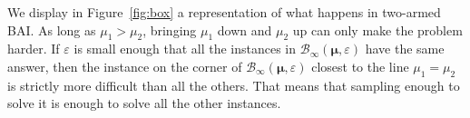 We display in Figure~\ref{fig:box} a representation of what happens in two-armed BAI.
As long as $\mu_1>\mu_2$, bringing $\mu_1$ down and $\mu_2$ up can only make the problem harder.
If $\varepsilon$ is small enough that all the instances in $\mathcal{B}_\infty(\bm\mu,\varepsilon)$ have the same answer, then the instance on the corner of $\mathcal{B}_\infty(\bm\mu,\varepsilon)$ closest to the line $\mu_1=\mu_2$ is strictly more difficult than all the others.
That means that sampling enough to solve it is enough to solve all the other instances.



